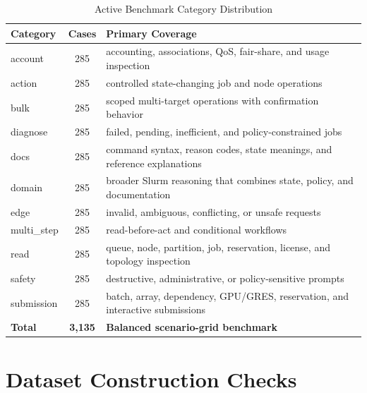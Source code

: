 \begin{table}[H]
\centering
\caption{Active Benchmark Category Distribution}
\label{tab:appendix-category-distribution}
\begin{tabular}{|l|c|p{7cm}|}
\hline
\textbf{Category} & \textbf{Cases} & \textbf{Primary Coverage} \\
\hline
account & 285 & accounting, associations, QoS, fair-share, and usage inspection \\
action & 285 & controlled state-changing job and node operations \\
bulk & 285 & scoped multi-target operations with confirmation behavior \\
diagnose & 285 & failed, pending, inefficient, and policy-constrained jobs \\
docs & 285 & command syntax, reason codes, state meanings, and reference explanations \\
domain & 285 & broader Slurm reasoning that combines state, policy, and documentation \\
edge & 285 & invalid, ambiguous, conflicting, or unsafe requests \\
multi\_step & 285 & read-before-act and conditional workflows \\
read & 285 & queue, node, partition, job, reservation, license, and topology inspection \\
safety & 285 & destructive, administrative, or policy-sensitive prompts \\
submission & 285 & batch, array, dependency, GPU/GRES, reservation, and interactive submissions \\
\hline
\textbf{Total} & \textbf{3,135} & \textbf{Balanced scenario-grid benchmark} \\
\hline
\end{tabular}
\end{table}

\section{Dataset Construction Checks}

